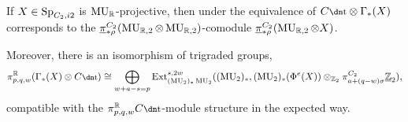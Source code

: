\begin{thm} \label{thm:Cta-homotopy}
  If $X \in \operatorname{\mathrm{Sp}}_{C_2, i2}$ is $\mathrm{MU}_{\mathbb{R}}$-projective,
  then under the equivalence of   
  $C\ta \otimes \Gamma_*(X)$ corresponds to the $\underline{\pi}_{*\rho} ^{C_2} (\operatorname{\mathrm{MU}}_{\mathbb{R},2} \otimes \operatorname{\mathrm{MU}}_{\mathbb{R},2})$-comodule
  $\underline{\pi}_{*\rho} ^{C_2} (\operatorname{\mathrm{MU}}_{\mathbb{R},2} \otimes X)$.

  Moreover, there is an isomorphism of trigraded groups,
  \[ \pi_{p,q,w} ^\R (\Gamma_* (X) \otimes C\ta) \cong \bigoplus_{w+a-s = p} \Ext_{(\MU_2)_* \MU_2}^{s,2w}((\MU_2)_*, (\MU_2)_{*} (\Phi^{e} (X)) \otimes_{\Z_2} \pi_{a + (q-w) \sigma}^{C_2} \uZt), \]
  compatible with the $\pi^{\R} _{p,q,w}C\ta$-module structure in the expected way.
  
%
\end{thm}



